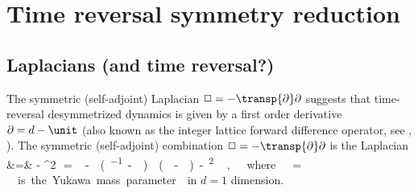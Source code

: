
\section{Time reversal symmetry reduction}
\label{sect:reversal}
\renewcommand{\ssp}{\ensuremath{\phi}}             %
\renewcommand{\Ssym}[1]{{\ensuremath{m_{#1}}}}    %
\renewcommand{\Xx}{\ensuremath{\mathsf{\Phi}}}      %


\subsection{Laplacians (and time reversal?)}
\label{sect:LapReversal}

                                                    \toCB

The symmetric (self-adjoint) Laplacian
$\Box = - \transp{\partial}\partial$
suggests that time-reversal desymmetrized dynamics is given by a first
order derivative \(
\partial = \shift  - \unit
\)
(also known as the integer lattice forward difference operator, see ,
).
The symmetric (self-adjoint) combination
$\Box = - \transp{\partial}\partial$ %
is the Laplacian
\bea
\jMorb &=&  \Box - {\mu}^2\unit
       \,=\, -
  \left(\shift^{-1}  - \unit \right)
  \left(\shift       - \unit \right)
   - {\mu}^2\unit
\,,
\label{LatLap}
\eea
where
\beq
{\mu }= 
\,.
is the
Yukawa mass parameter  in $d=1$ dimension.


